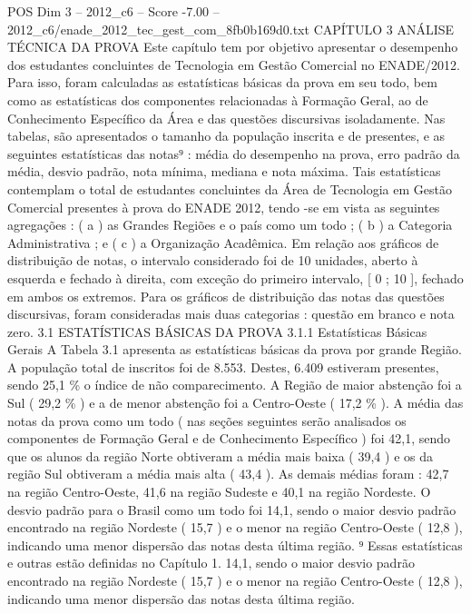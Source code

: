 \begin{textsample}{POS Dim 3 – 2012\_c6 – Score -7.00 – 2012\_c6/enade\_2012\_tec\_gest\_com\_8fb0b169d0.txt}  \label{ex:f3_pos_262}
CAPÍTULO 3 ANÁLISE TÉCNICA DA PROVA Este capítulo tem por objetivo apresentar o desempenho dos estudantes concluintes de Tecnologia em Gestão Comercial no ENADE/2012.
Para isso, foram calculadas as estatísticas básicas da prova em seu todo, bem como as estatísticas dos componentes relacionadas à Formação Geral, ao de Conhecimento Específico da Área e das questões discursivas isoladamente.
Nas tabelas, são apresentados o tamanho da população inscrita e de presentes, e as seguintes estatísticas das notas⁹ : média do desempenho na prova, erro padrão da média, desvio padrão, nota mínima, mediana e nota máxima.
Tais estatísticas contemplam o total de estudantes concluintes da Área de Tecnologia em Gestão Comercial presentes à prova do ENADE 2012, tendo -se em vista as seguintes agregações : ( a ) as Grandes Regiões e o país como um todo ; ( b ) a Categoria Administrativa ; e ( c ) a Organização Acadêmica.
Em relação aos gráficos de distribuição de notas, o intervalo considerado foi de 10 unidades, aberto à esquerda e fechado à direita, com exceção do primeiro intervalo, [ 0 ; 10 ], fechado em ambos os extremos.
Para os gráficos de distribuição das notas das questões discursivas, foram consideradas mais duas categorias : questão em branco e nota zero. 3.1 ESTATÍSTICAS BÁSICAS DA PROVA 3.1.1 Estatísticas Básicas Gerais A Tabela 3.1 apresenta as estatísticas básicas da prova por grande Região.
A população total de inscritos foi de 8.553.
Destes, 6.409 estiveram presentes, sendo 25,1 \% o índice de não comparecimento.
A Região de maior abstenção foi a Sul ( 29,2 \% ) e a de menor abstenção foi a Centro-Oeste ( 17,2 \% ).
A média das notas da prova como um todo ( nas seções seguintes serão analisados os componentes de Formação Geral e de Conhecimento Específico ) foi 42,1, sendo que os alunos da região Norte obtiveram a média mais baixa ( 39,4 ) e os da região Sul obtiveram a média mais alta ( 43,4 ).
As demais médias foram : 42,7 na região Centro-Oeste, 41,6 na região Sudeste e 40,1 na região Nordeste.
O desvio padrão para o Brasil como um todo foi 14,1, sendo o maior desvio padrão encontrado na região Nordeste ( 15,7 ) e o menor na região Centro-Oeste ( 12,8 ), indicando uma menor dispersão das notas desta última região. ⁹ Essas estatísticas e outras estão definidas no Capítulo 1. 14,1, sendo o maior desvio padrão encontrado na região Nordeste ( 15,7 ) e o menor na região Centro-Oeste ( 12,8 ), indicando uma menor dispersão das notas desta última região.

\end{textsample}
